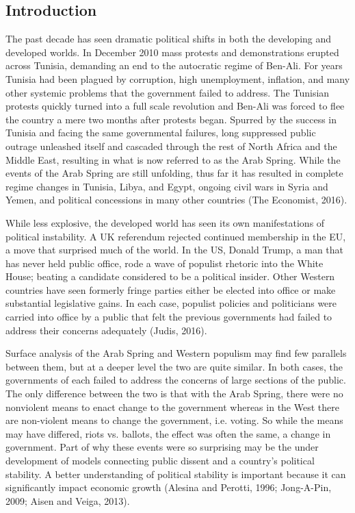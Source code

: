 \documentclass[12pt]{article}
\begin{document}
\begin{spacing}{1.5}


\section{Introduction}

The past decade has seen dramatic political shifts in both the developing and developed worlds. In December 2010 mass protests and demonstrations erupted across Tunisia, demanding an end to the autocratic regime of Ben-Ali. For years Tunisia had been plagued by corruption, high unemployment, inflation, and many other systemic problems that the government failed to address. The Tunisian protests quickly turned into a full scale revolution and Ben-Ali was forced to flee the country a mere two months after protests began. Spurred by the success in Tunisia and facing the same governmental failures, long suppressed public outrage unleashed itself and cascaded through the rest of North Africa and the Middle East, resulting in what is now referred to as the Arab Spring. While the events of the Arab Spring are still unfolding, thus far it has resulted in complete regime changes in Tunisia, Libya, and Egypt, ongoing civil wars in Syria and Yemen, and political concessions in many other countries (The Economist, 2016).  

While less explosive, the developed world has seen its own manifestations of political instability. A UK referendum rejected continued membership in the EU, a move that surprised much of the world. In the US, Donald Trump, a man that has never held public office, rode a wave of populist rhetoric into the White House; beating a candidate considered to be a political insider. Other Western countries have seen formerly fringe parties either be elected into office or make substantial legislative gains. In each case, populist policies and politicians were carried into office by a public that felt the previous governments had failed to address their concerns adequately (Judis, 2016).

Surface analysis of the Arab Spring and Western populism may find few parallels between them, but at a deeper level the two are quite similar. In both cases, the governments of each failed to address the concerns of large sections of the public. The only difference between the two is that with the Arab Spring, there were no nonviolent means to enact change to the government whereas in the West there are non-violent means to change the government, i.e. voting. So while the means may have differed, riots vs. ballots, the effect was often the same, a change in government. Part of why these events were so surprising may be the under development of models connecting public dissent and a country's political stability. A better understanding of political stability is important because it can significantly impact economic growth (Alesina and Perotti, 1996; Jong-A-Pin, 2009; Aisen and Veiga, 2013). 


\end{spacing}
\end{document}
